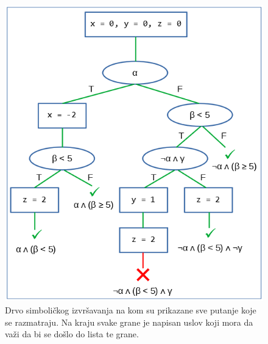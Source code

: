\begin{figure}[h!]
\centering
\includegraphics[scale=0.7]{images/sym_tree.png}
\caption{Drvo simboličkog izvršavanja na kom su prikazane sve putanje koje se razmatraju. Na kraju svake grane je napisan uslov koji mora da važi da bi se došlo do lista te grane.}
\label{fig:SymbolicExecTree}
\end{figure}

